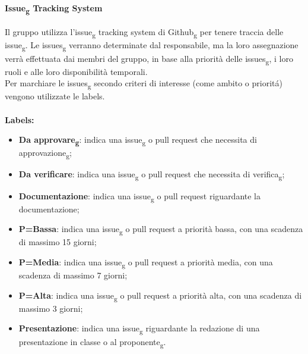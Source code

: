 \begin{itemize}
\paragraph{Issue\textsubscript{g} Tracking System}
Il gruppo utilizza l'issue\textsubscript{g} tracking system di Github\textsubscript{g} per tenere traccia delle issue\textsubscript{g}. 
Le issues\textsubscript{g} verranno determinate dal responsabile, ma la loro assegnazione verrà effettuata dai membri del gruppo, in base alla priorità delle issues\textsubscript{g}, i loro ruoli e alle loro disponibilità temporali.\\
Per marchiare le issues\textsubscript{g} secondo criteri di interesse (come ambito o prioritá) vengono utilizzate le labels.
\\\\\textbf{Labels:}
\begin{itemize}
	\item \textbf{Da approvare\textsubscript{g}}: indica una issue\textsubscript{g} o pull request che necessita di approvazione\textsubscript{g};
	\item \textbf{Da verificare}: indica una issue\textsubscript{g} o pull request che necessita di verifica\textsubscript{g};
	\item \textbf{Documentazione}: indica una issue\textsubscript{g} o pull request riguardante la documentazione;
	\item \textbf{P=Bassa}: indica una issue\textsubscript{g} o pull request a priorità bassa, con una scadenza di massimo 15 giorni;
	\item \textbf{P=Media}: indica una issue\textsubscript{g} o pull request a priorità media, con una scadenza di massimo 7 giorni;
	\item \textbf{P=Alta}: indica una issue\textsubscript{g} o pull request a priorità alta, con una scadenza di massimo 3 giorni;
	\item \textbf{Presentazione}: indica una issue\textsubscript{g} riguardante la redazione di una presentazione in classe o al proponente\textsubscript{g}.
\end{itemize}


\end{itemize}
